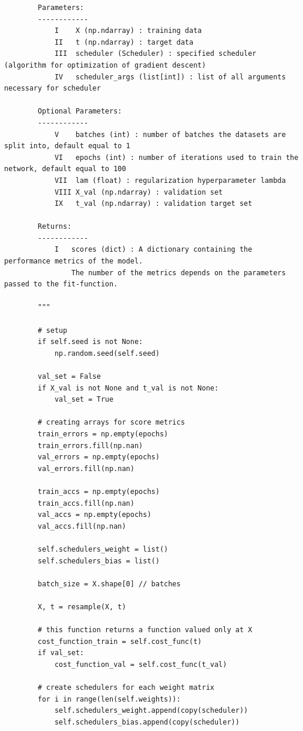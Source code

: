 \documentclass{beamer}
\begin{document}
\begin{frame}
\begin{verbatim}
        Parameters:
        ------------
            I    X (np.ndarray) : training data
            II   t (np.ndarray) : target data
            III  scheduler (Scheduler) : specified scheduler (algorithm for optimization of gradient descent)
            IV   scheduler_args (list[int]) : list of all arguments necessary for scheduler

        Optional Parameters:
        ------------
            V    batches (int) : number of batches the datasets are split into, default equal to 1
            VI   epochs (int) : number of iterations used to train the network, default equal to 100
            VII  lam (float) : regularization hyperparameter lambda
            VIII X_val (np.ndarray) : validation set
            IX   t_val (np.ndarray) : validation target set

        Returns:
        ------------
            I   scores (dict) : A dictionary containing the performance metrics of the model.
                The number of the metrics depends on the parameters passed to the fit-function.

        """

        # setup 
        if self.seed is not None:
            np.random.seed(self.seed)

        val_set = False
        if X_val is not None and t_val is not None:
            val_set = True

        # creating arrays for score metrics
        train_errors = np.empty(epochs)
        train_errors.fill(np.nan)
        val_errors = np.empty(epochs)
        val_errors.fill(np.nan)

        train_accs = np.empty(epochs)
        train_accs.fill(np.nan)
        val_accs = np.empty(epochs)
        val_accs.fill(np.nan)

        self.schedulers_weight = list()
        self.schedulers_bias = list()

        batch_size = X.shape[0] // batches

        X, t = resample(X, t)

        # this function returns a function valued only at X
        cost_function_train = self.cost_func(t)
        if val_set:
            cost_function_val = self.cost_func(t_val)

        # create schedulers for each weight matrix
        for i in range(len(self.weights)):
            self.schedulers_weight.append(copy(scheduler))
            self.schedulers_bias.append(copy(scheduler))


\end{verbatim}
\end{frame}
\end{document}
